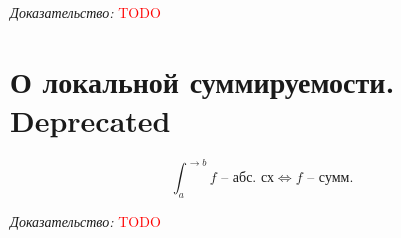 \documentclass[paper=a4, fontsize=17pt]{article}
\begin{document}
\emph{Доказательство:} \textcolor{red}{TODO}

\section{О локальной суммируемости. \Large Deprecated}
$$ \int_{a}^{\rightarrow b} f \text{ -- абс. сх} \Longleftrightarrow f \text{ -- сумм.}$$

\emph{Доказательство:} \textcolor{red}{TODO}
\end{document}
